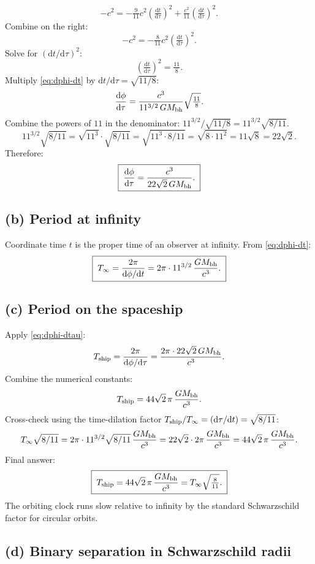 \documentclass[11pt]{article}
\newcommand{\de}{\mathrm{d}}
\begin{document}
\[ -c^2 = -\tfrac{9}{11}c^2\!\left(\tfrac{\de t}{\de\tau}\right)^{\!2} + \tfrac{c^2}{11}\!\left(\tfrac{\de t}{\de\tau}\right)^{\!2}. \]
Combine on the right:
\[ -c^2 = -\tfrac{8}{11}c^2\!\left(\tfrac{\de t}{\de\tau}\right)^{\!2}. \]
Solve for $(\de t/\de\tau)^2$:
\[ \left(\tfrac{\de t}{\de\tau}\right)^{\!2} = \tfrac{11}{8}. \]
Multiply \eqref{eq:dphi-dt} by $\de t/\de\tau = \sqrt{11/8}$:
\[ \frac{\de\phi}{\de\tau} = \frac{c^3}{11^{3/2}\,GM_{\rm bh}}\sqrt{\tfrac{11}{8}}. \]
Combine the powers of $11$ in the denominator: $11^{3/2}/\sqrt{11/8} = 11^{3/2}\sqrt{8/11}$.
\[ 11^{3/2}\sqrt{8/11} = \sqrt{11^3}\cdot\sqrt{8/11} = \sqrt{11^3\cdot 8/11} = \sqrt{8\cdot 11^2} = 11\sqrt 8 = 22\sqrt 2. \]
Therefore:
\begin{equation}
\boxed{\;\frac{\de\phi}{\de\tau} = \frac{c^3}{22\sqrt{2}\,GM_{\rm bh}}.\;}
\label{eq:dphi-dtau}
\end{equation}

\subsection*{(b) Period at infinity}

Coordinate time $t$ is the proper time of an observer at infinity. From \eqref{eq:dphi-dt}:
\begin{equation}
\boxed{\;T_\infty = \frac{2\pi}{\de\phi/\de t} = 2\pi\cdot 11^{3/2}\,\frac{GM_{\rm bh}}{c^3}.\;}
\label{eq:T-infinity}
\end{equation}

\subsection*{(c) Period on the spaceship}

Apply \eqref{eq:dphi-dtau}:
\[ T_{\rm ship} = \frac{2\pi}{\de\phi/\de\tau} = \frac{2\pi\cdot 22\sqrt 2\,GM_{\rm bh}}{c^3}. \]
Combine the numerical constants:
\[ T_{\rm ship} = 44\sqrt 2\,\pi\,\frac{GM_{\rm bh}}{c^3}. \]
Cross-check using the time-dilation factor $T_{\rm ship}/T_\infty = (\de\tau/\de t) = \sqrt{8/11}$:
\[ T_\infty\sqrt{8/11} = 2\pi\cdot 11^{3/2}\sqrt{8/11}\,\frac{GM_{\rm bh}}{c^3} = 22\sqrt 2\cdot 2\pi\,\frac{GM_{\rm bh}}{c^3} = 44\sqrt 2\,\pi\,\frac{GM_{\rm bh}}{c^3}. \]
Final answer:
\[ \boxed{\;T_{\rm ship} = 44\sqrt 2\,\pi\,\frac{GM_{\rm bh}}{c^3} = T_\infty\sqrt{\tfrac{8}{11}}.\;} \]
The orbiting clock runs slow relative to infinity by the standard Schwarzschild factor for circular orbits.

\subsection*{(d) Binary separation in Schwarzschild radii}
\end{document}
